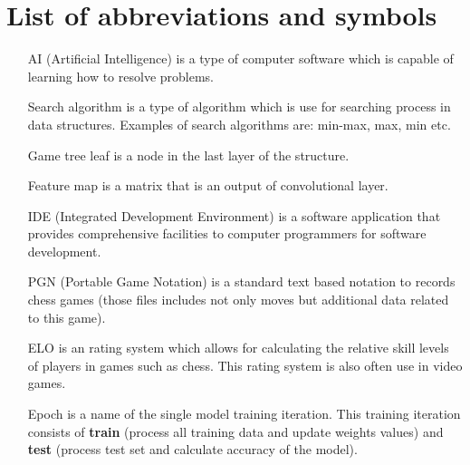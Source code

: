 \chapter{List of abbreviations and symbols}

\begin{itemize}
    \item[AI] (Artificial Intelligence) is a type of computer software which is capable of learning how to resolve problems.
    \item[Search algorithm] is a type of algorithm which is use for searching process in data structures. Examples of search algorithms are: min-max, max, min etc.
    \item[Game tree leaf] is a node in the last layer of the structure.
    \item[Feature map] is a matrix that is an output of convolutional layer. 
    \item[IDE] (Integrated Development Environment) is a software application that provides comprehensive facilities to computer programmers for software development.
    \item[PGN] (Portable Game Notation) is a standard text based notation to records chess games (those files includes not only moves but additional data related to this game).
    \item[ELO] is an rating system which allows for calculating the relative skill levels of players in games such as chess. This rating system is also often use in video games.
    \item[Epoch] is a name of the single model training iteration. This training iteration consists of \textbf{train} (process all training data and update weights values) and \textbf{test} (process test set and calculate accuracy of the model).
\end{itemize}
